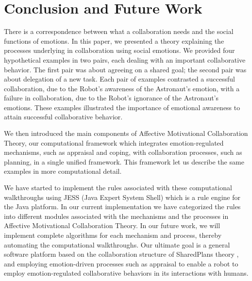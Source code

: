 \section{Conclusion and Future Work}

There is a correspondence between what a collaboration needs and the social
functions of emotions. In this paper, we presented a theory explaining the
processes underlying in collaboration using social emotions. We provided four
hypothetical examples in two pairs, each dealing with an important collaborative
behavior. The first pair was about agreeing on a shared goal; the second pair
was about delegation of a new task. Each pair of examples contrasted a
successful collaboration, due to the Robot's awareness of the Astronaut's
emotion, with a failure in collaboration, due to the Robot's ignorance of the
Astronaut's emotions. These examples illustrated the importance of
emotional awareness to attain successful collaborative behavior.

We then introduced the main components of Affective Motivational Collaboration
Theory, our computational framework which integrates emotion-regulated
mechanisms, such as appraisal and coping, with collaboration processes, such as
planning, in a single unified framework. This framework let us describe the same
examples in more computational detail.

We have started to implement the rules associated with these computational
walkthroughs using JESS (Java Expert System Shell) which is a rule engine for
the Java platform. In our current implementation we have categorized the rules
into different modules associated with the mechanisms and the processes in
Affective Motivational Collaboration Theory. In our future work, we will
implement complete algorithms for each mechanism and process, thereby automating
the computational walkthroughs. Our ultimate goal is a general software platform
based on the collaboration structure of SharedPlans theory
\cite{grosz:discourse-structure}, and employing emotion-driven processes such as
appraisal \cite{marsella:ema-process-model} to enable a robot to employ
emotion-regulated collaborative behaviors in its interactions with humans.




